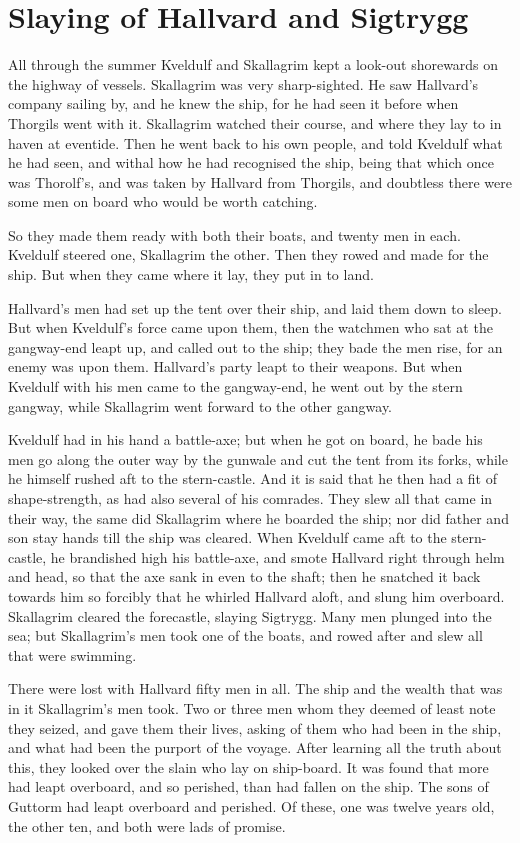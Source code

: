 \chapter{Slaying of Hallvard and Sigtrygg}
All through the summer Kveldulf and Skallagrim kept a look-out shorewards on the highway of vessels. Skallagrim was very sharp-sighted. He saw Hallvard's company sailing by, and he knew the ship, for he had seen it before when Thorgils went with it. Skallagrim watched their course, and where they lay to in haven at eventide. Then he went back to his own people, and told Kveldulf what he had seen, and withal how he had recognised the ship, being that which once was Thorolf's, and was taken by Hallvard from Thorgils, and doubtless there were some men on board who would be worth catching.

So they made them ready with both their boats, and twenty men in each. Kveldulf steered one, Skallagrim the other. Then they rowed and made for the ship. But when they came where it lay, they put in to land.

Hallvard's men had set up the tent over their ship, and laid them down to sleep. But when Kveldulf's force came upon them, then the watchmen who sat at the gangway-end leapt up, and called out to the ship; they bade the men rise, for an enemy was upon them. Hallvard's party leapt to their weapons. But when Kveldulf with his men came to the gangway-end, he went out by the stern gangway, while Skallagrim went forward to the other gangway.

Kveldulf had in his hand a battle-axe; but when he got on board, he bade his men go along the outer way by the gunwale and cut the tent from its forks, while he himself rushed aft to the stern-castle. And it is said that he then had a fit of shape-strength, as had also several of his comrades. They slew all that came in their way, the same did Skallagrim where he boarded the ship; nor did father and son stay hands till the ship was cleared. When Kveldulf came aft to the stern-castle, he brandished high his battle-axe, and smote Hallvard right through helm and head, so that the axe sank in even to the shaft; then he snatched it back towards him so forcibly that he whirled Hallvard aloft, and slung him overboard. Skallagrim cleared the forecastle, slaying Sigtrygg. Many men plunged into the sea; but Skallagrim's men took one of the boats, and rowed after and slew all that were swimming.

There were lost with Hallvard fifty men in all. The ship and the wealth that was in it Skallagrim's men took. Two or three men whom they deemed of least note they seized, and gave them their lives, asking of them who had been in the ship, and what had been the purport of the voyage. After learning all the truth about this, they looked over the slain who lay on ship-board. It was found that more had leapt overboard, and so perished, than had fallen on the ship. The sons of Guttorm had leapt overboard and perished. Of these, one was twelve years old, the other ten, and both were lads of promise.

